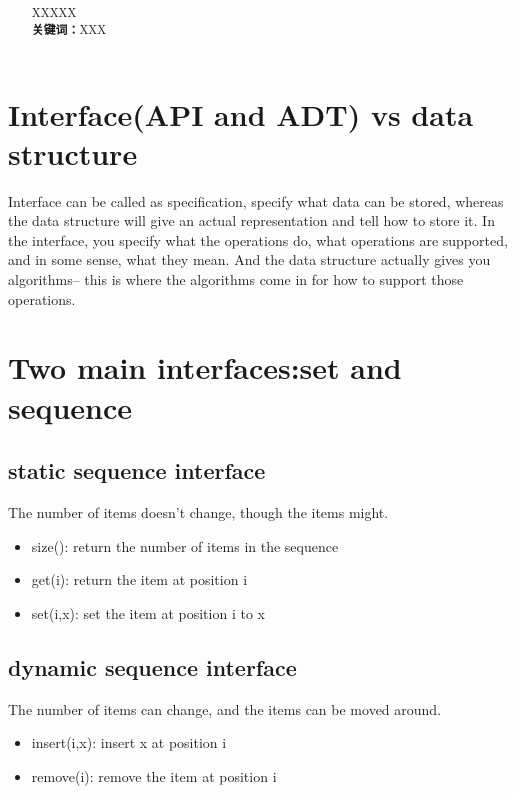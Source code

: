 \documentclass[10.5pt,hyperref,a4paper,UTF8]{ctexart}
\begin{document}
\cover

\begin{abstract}
%
XXXXX\\
\textbf{关键词：}XXX
%
\end{abstract}

\newpage
\tableofcontents
\thispagestyle{empty} %

\newpage
\setcounter{page}{1} %

\begin{center}
    \title{ \Huge \textbf{} }
\end{center}


\thispagestyle{empty} %


\section{Interface(API and ADT) vs data structure}
Interface can be called as specification, specify what data can be stored,
whereas the data structure will give an actual representation and tell how to store it.
In the interface, you specify what the operations do, what operations are supported, and in some sense, what they mean.
And the data structure actually gives you algorithms-- this is where the algorithms come in for how to support those operations.

\section{Two main interfaces:set and sequence}
\subsection{static sequence interface}
The number of items doesn't change, though the items might.
\begin{itemize}
    \item size(): return the number of items in the sequence
    \item get(i): return the item at position i
    \item set(i,x): set the item at position i to x
\end{itemize}

\subsection{dynamic sequence interface}
The number of items can change, and the items can be moved around.
\begin{itemize}
    \item insert(i,x): insert x at position i
    \item remove(i): remove the item at position i
\end{itemize}
\end{document}
